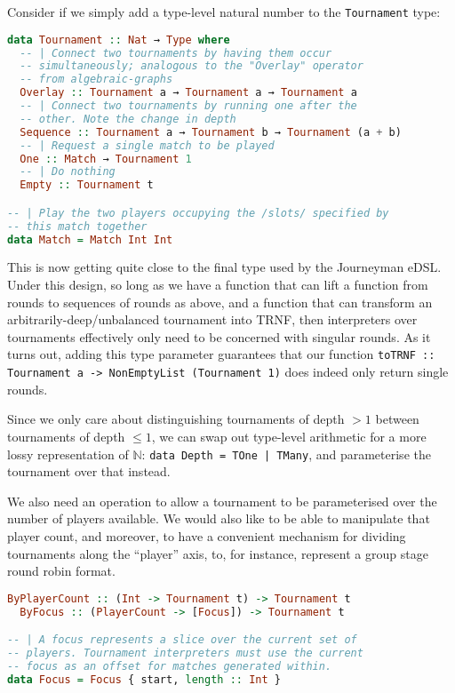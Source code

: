 \documentclass[a4,11pt,twoside,final,hidelinks]{article}
\begin{document}
\newpage
Consider if we simply add a type-level natural number to the \texttt{Tournament} type:

\begin{lstlisting}[language=haskell,numbers=none]
data Tournament :: Nat → Type where
  -- | Connect two tournaments by having them occur
  -- simultaneously; analogous to the "Overlay" operator
  -- from algebraic-graphs
  Overlay :: Tournament a → Tournament a → Tournament a
  -- | Connect two tournaments by running one after the
  -- other. Note the change in depth
  Sequence :: Tournament a → Tournament b → Tournament (a + b)
  -- | Request a single match to be played
  One :: Match → Tournament 1
  -- | Do nothing
  Empty :: Tournament t

-- | Play the two players occupying the /slots/ specified by
-- this match together
data Match = Match Int Int
\end{lstlisting}

This is now getting quite close to the final type used by the Journeyman eDSL.
Under this design, so long as we have a function that can lift a function from
rounds to sequences of rounds as above, and a function that can transform an
arbitrarily-deep/unbalanced tournament into TRNF, then interpreters over
tournaments effectively only need to be concerned with singular rounds. As it
turns out, adding this type parameter guarantees that our function \texttt{toTRNF ::
Tournament a -> NonEmptyList (Tournament 1)} does indeed only return single rounds.

Since we only care about distinguishing tournaments of depth \(> 1\) between
tournaments of depth \(\le 1\), we can swap out type-level arithmetic for a more
lossy representation of \(\mathbb{N}\): \texttt{data Depth = TOne | TMany}, and
parameterise the tournament over that instead.

We also need an operation to allow a tournament to be parameterised over the
number of players available. We would also like to be able to manipulate that
player count, and moreover, to have a convenient mechanism for dividing
tournaments along the ``player'' axis, to, for instance, represent a group stage
round robin format.

\begin{lstlisting}[language=haskell,numbers=none]
  ByPlayerCount :: (Int -> Tournament t) -> Tournament t
  ByFocus :: (PlayerCount -> [Focus]) -> Tournament t

-- | A focus represents a slice over the current set of
-- players. Tournament interpreters must use the current
-- focus as an offset for matches generated within.
data Focus = Focus { start, length :: Int }
\end{lstlisting}
\end{document}
